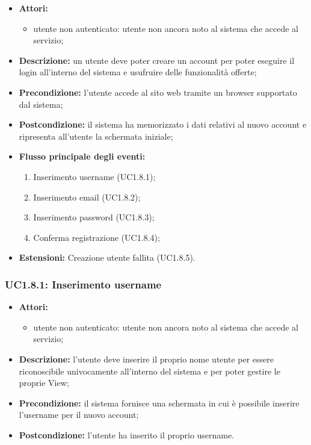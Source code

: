 \begin{itemize}
	\item \textbf{Attori:}
	\begin{itemize}
		\item utente non autenticato: utente non ancora noto al sistema che accede al servizio;
	\end{itemize}
	\item \textbf{Descrizione:} un utente deve poter creare un account per poter eseguire il login
	all'interno del sistema e usufruire delle funzionalità offerte;
	\item \textbf{Precondizione:} l'utente accede al sito web tramite un browser supportato
	dal sistema;
	\item \textbf{Postcondizione:} il sistema ha memorizzato i dati relativi al nuovo account e
	ripresenta all'utente la schermata iniziale;
	\item \textbf{Flusso principale degli eventi:}
	\begin{enumerate}
		\item Inserimento username (UC1.8.1);
		\item Inserimento email (UC1.8.2);
		\item Inserimento password (UC1.8.3);
		\item Conferma registrazione (UC1.8.4);
	\end{enumerate}
	\item \textbf{Estensioni:} Creazione utente fallita (UC1.8.5).
\end{itemize}


\subsubsection{UC1.8.1: Inserimento username}

\begin{itemize}
	\item \textbf{Attori:}
	\begin{itemize}
		\item utente non autenticato: utente non ancora noto al sistema che accede al servizio;
	\end{itemize}
	\item \textbf{Descrizione:} l'utente deve inserire il proprio nome utente per essere riconoscibile univocamente all'interno del sistema e per poter gestire le proprie View;
	\item \textbf{Precondizione:} il sistema fornisce una schermata in cui è possibile inserire l'username per il nuovo account;
	\item \textbf{Postcondizione:} l'utente ha inserito il proprio username.
\end{itemize}

